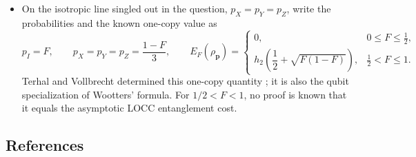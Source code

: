 \begin{itemize}
  \item On the isotropic line singled out in the question,
  $p_X=p_Y=p_Z$, write the probabilities and the known one-copy value as
  \begin{equation}
    p_I=F,
    \qquad p_X=p_Y=p_Z=\frac{1-F}{3},
    \qquad
    E_F(\rho_{\mathbf p})=
    \begin{cases}
      0, & 0\leq F\leq\tfrac12,\\
      h_2\!\left(\dfrac12+\sqrt{F(1-F)}\right),
        & \tfrac12<F\leq1.
    \end{cases}
    \label{eq:p7-isotropic-eof}
  \end{equation}
  Terhal and Vollbrecht determined this one-copy quantity
  ; it is also the qubit
  specialization of Wootters' formula.  For $1/2<F<1$, no proof is known
  that it equals the asymptotic LOCC entanglement cost.
\end{itemize}

\subsection*{References}

